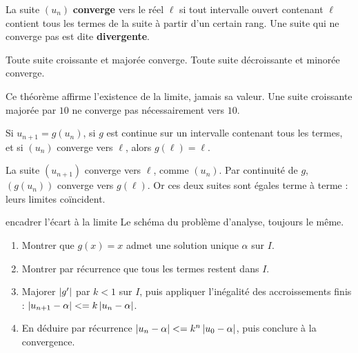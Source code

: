 \begin{definition}
La suite $(u_{n})$ \textbf{converge} vers le réel $\ell$ si tout intervalle
ouvert contenant $\ell$ contient tous les termes de la suite à partir d'un
certain rang. Une suite qui ne converge pas est dite \textbf{divergente}.
\end{definition}

\begin{theoreme}
Toute suite croissante et majorée converge. Toute suite décroissante et
minorée converge.
\end{theoreme}

\begin{avertissement}
Ce théorème affirme l'existence de la limite, jamais sa valeur. Une suite
croissante majorée par $10$ ne converge pas nécessairement vers $10$.
\end{avertissement}

\begin{theoreme}
Si $u_{n+1} = g(u_{n})$, si $g$ est continue sur un intervalle contenant tous
les termes, et si $(u_{n})$ converge vers $\ell$, alors $g(\ell) = \ell$.
\end{theoreme}

\begin{demonstration}
La suite $(u_{n+1})$ converge vers $\ell$, comme $(u_{n})$. Par continuité de
$g$, $\left(g(u_{n})\right)$ converge vers $g(\ell)$. Or ces deux suites sont
égales terme à terme : leurs limites coïncident.
\end{demonstration}

\begin{methode}{encadrer l'écart à la limite}
Le schéma du problème d'analyse, toujours le même.
\begin{enumerate}[label=\textbf{\arabic*.}, leftmargin=*, itemsep=0.15em]
  \item Montrer que $g(x) = x$ admet une solution unique $\alpha$ sur $I$.
  \item Montrer par récurrence que tous les termes restent dans $I$.
  \item Majorer $\left|g'\right|$ par $k<1$ sur $I$, puis appliquer l'inégalité des
        accroissements finis : $\left|u_{n+1}-\alpha\right| <= k\left|u_{n}-\alpha\right|$.
  \item En déduire par récurrence $\left|u_{n}-\alpha\right| <= k^{n}\left|u_{0}-\alpha\right|$,
        puis conclure à la convergence.
\end{enumerate}
\end{methode}

